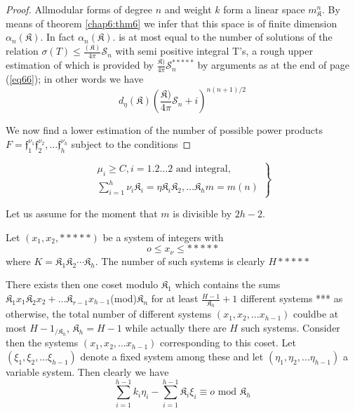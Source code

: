 \begin{proof}
\setcounter{pageoriginal}{85}
All\pageoriginale modular forms of degree $n$ and weight $k$ form a linear space
$m^{n}_{\mathfrak{K}}$. By means of theorem \ref{chap6:thm6} we infer that this
space is of finite dimension $\alpha_{n}(\mathfrak{K})$. In fact
$\alpha_{n}(\mathfrak{K})$. is at most equal to the number of solutions
of the relation $\sigma(T) \leq \frac{(\mathfrak{K})}{4 \pi}
\mathscr{S}_n$ with semi positive integral T's, a rough upper
  estimation of which is provided by $\frac{\mathfrak{K})}{4 \pi}
  \mathscr{S}_n^{*****}$ by arguments as at the end of page (\ref{eq66}); in
  other words we have  
\begin{equation*}
d_{\eta}(\mathfrak{K}) (\frac{\mathfrak{K})}{4 \pi} \mathscr{S}_n
+i)^{n(n+1)/2} \tag{115}\label{eq115}  
\end{equation*}

We now find a lower estimation of the number of possible power
products $F =\mathfrak{f}^{\nu_1}_1 \mathfrak{f}^{\nu_2}_2, \ldots
\mathfrak{f}^{\nu_h}_h$ subject to the conditions  
\end{proof}
\begin{equation*}
\left.
\tag{116}\label{eq116} 
\begin{aligned}
\mu_i \geq C , i = 1.2 \ldots 2 \text{ and integral},\\
\sum^h_{i=1} \nu_i \mathfrak{K}_i = \eta \mathfrak{K}_i \mathfrak{K}_2 ,
\ldots \mathfrak{K}_h m=m(n) 
\end{aligned}
\right \}
\end{equation*}

Let us assume for the moment that $m$ is divisible by $2h -2$.

Let $(x_1, x_2, *****)$ be a system of integers with 
\begin{equation*}
o \leq x_{\nu} \leq ***** \tag{117}\label{eq117} 
\end{equation*}
where $K = \mathfrak{K}_1 \mathfrak{K}_2 \cdots \mathfrak{K}_h$. The
number of such systems is clearly $H*****$ 

There exists then one coset modulo $\mathfrak{K}_1$ which contains the
sums $\mathfrak{K}_1 x_1 \mathfrak{K}_2 x_2 + \ldots \mathfrak{K}_{r-1}
x_{h-1} $(mod)$\mathfrak{K}_n$ for at least
$\frac{H-1}{\mathfrak{K}_h}+1$ different systems *** as otherwise,
the total number of different systems $(x_1, x_2, \ldots x_{h-1})$
could\pageoriginale be at most 
$H-1_{/\mathfrak{K}_h}$, $\mathfrak{K}_h= H-1$ while actually there are $H$
such systems. Consider then the systems $(x_1,x_2, \ldots x_{h-1})$
corresponding to this coset. Let $(\xi_1, \xi_2, \ldots \xi_{h-1})$
denote a fixed system among these and let $(\eta_1, \eta_2 , \ldots
\eta_{h-1})$ a variable system. Then clearly we have  
\begin{equation*}
\sum^{h-1}_{i=1} k_i\eta_i - \sum^{h-1}_{i=1}\mathfrak{K}_i  \xi_i \equiv o
\text{ mod }\mathfrak{K}_h \tag{118}\label{eq118}  
\end{equation*}

